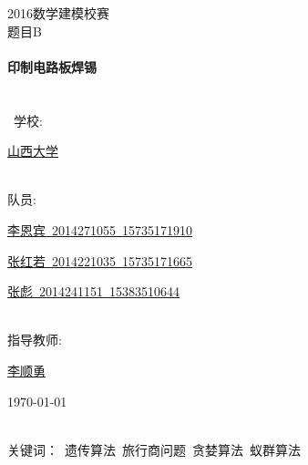 \documentclass[fontset=windows,a4paper,12pt]{ctexart}
\begin{document}
\begin{titlepage} \begin{center} %
  \textsc{\LARGE 2016数学建模校赛}\\
  [1.5cm] \textsc{\Large 题目\quad B}\\
  [0.5cm]\ \\
  [0.4cm] { \huge \bfseries 印制电路板焊锡}\\[0.4cm]\ \\[1.5cm]\ \\[1.4cm]\ 
  \large {学\quad\quad 校:} 
  \begin{minipage}[t]{0.7\textwidth}
    \centering
    \uline{\hspace{6em}山西大学\hfill} \makebox[0.66em]{}\par
  \end{minipage}
  \\[0.6cm]
  \large {队\quad\quad 员:} 
  \begin{minipage}[t]{0.7\textwidth} 
    \uline{\hspace{3em}李恩宾\ 2014271055\ 15735171910\hfill} \makebox[0.66em]{}\par
    \uline{\hspace{3em}张红若\ 2014221035\ 15735171665\hfill} \makebox[0.66em]{}\par
    \uline{\hspace{3em}张彪\quad\ 2014241151\ 15383510644\hfill} \makebox[0.66em]{}\par
  \end{minipage}
  \\[0.6cm]
  \large {指导教师:} 
  \begin{minipage}[t]{0.7\textwidth}
    \centering
    \uline{\hspace{6em}李顺勇 \hfill} \makebox[0.66em]{}\par
  \end{minipage}
  \vfill %
  {\large \today} \end{center} \end{titlepage}
  \begin{center}
  \end{center}
  \linespread{1.2}
  \begin{center}
  \end{center}
  \\
  关键词：\ 遗传算法\ 旅行商问题\ 贪婪算法\ 蚁群算法
\end{document}
